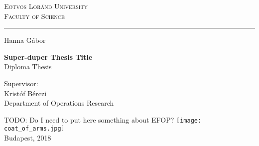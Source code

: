 \begin{titlepage}
  \begin{center}
    \textsc{
      \large
      Eötvös Loránd University \\
      Faculty of Science \\
    }
    \vspace{0.4cm}

    \rule{14cm}{0.4pt}
    \vspace*{1.2cm}

    \LARGE{Hanna Gábor}

    \huge
    \vspace{0.6cm}
    \textbf{Super-duper Thesis Title} \\
    \vspace{0.3cm}
    \normalsize
    Diploma Thesis \\
    \vspace{1.5cm}

    \large
    Supervisor: \\
    \vspace{0.3cm}
    Kristóf Bérczi \\
    Department of Operations Research

    \vfill
    TODO: Do I need to put here something about EFOP?
    \texttt{[image: coat\_of\_arms.jpg]} \\
    \vspace{0.1cm}
    \normalsize
    Budapest, 2018
  \end{center}
\end{titlepage}
